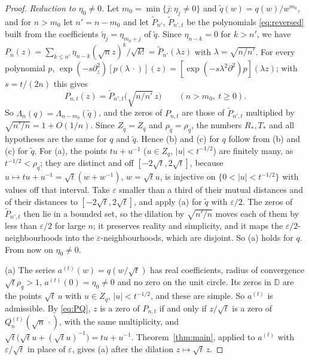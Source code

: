 \documentclass[11pt]{amsart}
\theoremstyle{definition}
\theoremstyle{remark}
\numberwithin{equation}{section}
\newcommand{\D}{\mathbb{D}}
\newcommand{\eps}{\varepsilon}
\begin{document}
\begin{proof}
\emph{Reduction to $\eta_0\ne0$.} Let $m_0=\min\{j:\eta_j\ne0\}$ and $\tilde q(w)=q(w)/w^{m_0}$, and for $n>m_0$ let $n'=n-m_0$ and let $\widetilde P_{n'}$, $\widetilde P_{n',t}$ be the polynomials \eqref{eq:reversed} built from the coefficients $\tilde\eta_j=\eta_{m_0+j}$ of $\tilde q$. Since $\eta_{n-k}=0$ for $k>n'$, we have $P_n(z)=\sum_{k\le n'}\eta_{n-k}(\sqrt nz)^k/\sqrt{k!}=\widetilde P_{n'}(\lambda z)$ with $\lambda=\sqrt{n/n'}$. For every polynomial $p$, $\exp(-s\partial_z^2)[p(\lambda\,\cdot)](z)=[\exp(-s\lambda^2\partial^2)p](\lambda z)$; with $s=t/(2n)$ this gives
\begin{equation}\label{eq:reduction}
P_{n,t}(z)=\widetilde P_{n',t}\bigl(\sqrt{n/n'}\,z\bigr)\qquad(n>m_0,\ t\ge0).
\end{equation}
So $\Lambda_n(q)=\Lambda_{n-m_0}(\tilde q)$, and the zeros of $P_{n,t}$ are those of $\widetilde P_{n',t}$ multiplied by $\sqrt{n'/n}=1+O(1/n)$. Since $Z_{\tilde q}=Z_q$ and $\rho_{\tilde q}=\rho_q$, the numbers $R_*,T_*$ and all hypotheses are the same for $q$ and $\tilde q$. Hence (b) and (c) for $q$ follow from (b) and (c) for $\tilde q$. For (a), the points $tu+u^{-1}$ ($u\in Z_q$, $|u|<t^{-1/2}$) are finitely many, as $t^{-1/2}<\rho_q$; they are distinct and off $[-2\sqrt t,2\sqrt t]$, because $u\mapsto tu+u^{-1}=\sqrt t(w+w^{-1})$, $w=\sqrt tu$, is injective on $\{0<|u|<t^{-1/2}\}$ with values off that interval. Take $\eps$ smaller than a third of their mutual distances and of their distances to $[-2\sqrt t,2\sqrt t]$, and apply (a) for $\tilde q$ with $\eps/2$. The zeros of $\widetilde P_{n',t}$ then lie in a bounded set, so the dilation by $\sqrt{n'/n}$ moves each of them by less than $\eps/2$ for large $n$; it preserves reality and simplicity, and it maps the $\eps/2$-neighbourhoods into the $\eps$-neighbourhoods, which are disjoint. So (a) holds for $q$. From now on $\eta_0\ne0$.

(a) The series $a^{(t)}(w)=q(w/\sqrt t)$ has real coefficients, radius of convergence $\sqrt t\rho_q>1$, $a^{(t)}(0)=\eta_0\ne0$ and no zero on the unit circle. Its zeros in $\D$ are the points $\sqrt t\,u$ with $u\in Z_q$, $|u|<t^{-1/2}$, and these are simple. So $a^{(t)}$ is admissible. By \eqref{eq:PQ}, $z$ is a zero of $P_{n,t}$ if and only if $z/\sqrt t$ is a zero of $Q_n^{(t)}(\sqrt n\,\cdot)$, with the same multiplicity, and $\sqrt t\bigl(\sqrt tu+(\sqrt tu)^{-1}\bigr)=tu+u^{-1}$. Theorem~\ref{thm:main}, applied to $a^{(t)}$ with $\eps/\sqrt t$ in place of $\eps$, gives (a) after the dilation $z\mapsto\sqrt t\,z$.


\end{proof}
\end{document}
